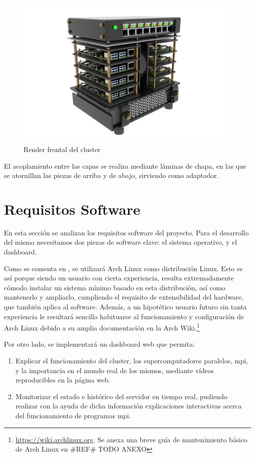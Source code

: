 \begin{figure}[h!]
  \centering
  \includegraphics[width=\textwidth]{img/cluster_render_front.jpg}
  \caption{Render frontal del cluster}
  \label{fig:render_cluster_1}
\end{figure}

El acoplamiento entre las capas se realiza mediante láminas de chapa, en las que se atornillan las piezas de arriba y de abajo, sirviendo como adaptador.


\section{Requisitos Software}
\label{sec:requisitos_software}
En esta sección se analizan los requisitos software del proyecto. Para el desarrollo del mismo necesitamos dos piezas de software clave: el sistema operativo, y el dashboard.

Como se comenta en , se utilizará Arch Linux como distribución Linux. Esto es así porque siendo un usuario con cierta experiencia, resulta extremadamente cómodo instalar un sistema mínimo basado en esta distribución, así como mantenerlo y ampliarlo, cumpliendo el requisito de extensibilidad del hardware, que también aplica al software. Además, a un hipotético usuario futuro sin tanta experiencia le resultará sencillo habituarse al funcionamiento y configuración de Arch Linux debido a su amplia documentación en la Arch Wiki.\footnote{\url{https://wiki.archlinux.org}. Se anexa una breve guía de mantenimiento básico de Arch Linux en \#REF\# TODO ANEXO}

Por otro lado, se implementará un dashboard web que permita:
\begin{enumerate}
    \item Explicar el funcionamiento del cluster, los supercomputadores paralelos, \acrshort{mpi}, y la importancia en el mundo real de los mismos, mediante vídeos reproducibles en la página web.
    \item Monitorizar el estado e histórico del servidor en tiempo real, pudiendo realizar con la ayuda de dicha información explicaciones interactivas acerca del funcionamiento de programas \acrshort{mpi}.
\end{enumerate}

